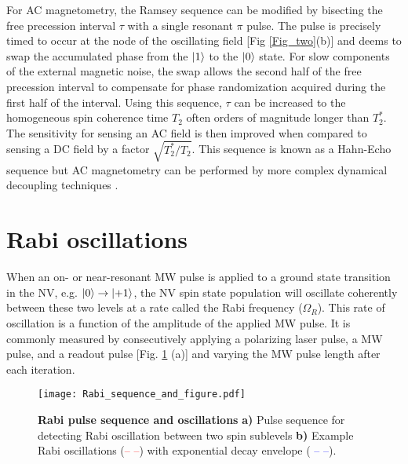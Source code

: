 For AC magnetometry, the Ramsey sequence can be modified by bisecting the free precession interval $\tau$ with a single resonant $\pi$ pulse. The pulse is precisely timed to occur at the node of the oscillating field [Fig \ref{Fig_two}(b)] and deems to swap the accumulated phase from the $\ket{1}$ to the $\ket{0}$ state. For slow components of the external magnetic noise, the swap allows the second half of the free precession interval to compensate for phase randomization acquired during the first half of the interval. Using this sequence, $\tau$ can be increased to the homogeneous spin coherence time $T_2$ often orders of magnitude longer than $T_2^*$. The sensitivity for sensing an AC field is then improved when compared to sensing a DC field by a factor $\sqrt{T_2^*/T_2}$. This sequence is known as a Hahn-Echo sequence but AC magnetometry can be performed by more complex dynamical decoupling techniques \cite{carr1954effects, meiboom1958modified}.


\section{Rabi oscillations} \label{Rabi}

When an on- or near-resonant MW pulse is applied to a ground state transition in the NV, e.g. $\ket{0} \rightarrow \ket{+1}$, the NV spin state population will oscillate coherently between these two levels at a rate called the Rabi frequency ($\Omega_R$). This rate of oscillation is a function of the amplitude of the applied MW pulse. It is commonly measured by consecutively applying a polarizing laser pulse, a MW pulse, and a readout pulse [Fig. \ref{Fig1_3} (a)] and varying the MW pulse length after each iteration. 

\begin{figure}[t!]
\centering
\texttt{[image: Rabi\_sequence\_and\_figure.pdf]}  
\caption{\textbf{Rabi pulse sequence and oscillations} \textbf{a)} Pulse sequence for detecting Rabi oscillation between two spin sublevels \textbf{b)} Example Rabi oscillations (\textcolor{red}{-- --}) with exponential decay envelope (\textcolor{blue}{ -- --}).}
\label{Fig1_3}
\end{figure}

